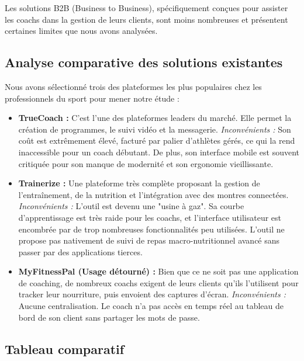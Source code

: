 Les solutions B2B (Business to Business), spécifiquement conçues pour assister les coachs dans la gestion de leurs clients, sont moins nombreuses et présentent certaines limites que nous avons analysées.

\subsection{Analyse comparative des solutions existantes}
Nous avons sélectionné trois des plateformes les plus populaires chez les professionnels du sport pour mener notre étude :

\begin{itemize}
    \item \textbf{TrueCoach :} C'est l'une des plateformes leaders du marché. Elle permet la création de programmes, le suivi vidéo et la messagerie.
    \textit{Inconvénients :} Son coût est extrêmement élevé, facturé par palier d'athlètes gérés, ce qui la rend inaccessible pour un coach débutant. De plus, son interface mobile est souvent critiquée pour son manque de modernité et son ergonomie vieillissante.
    
    \item \textbf{Trainerize :} Une plateforme très complète proposant la gestion de l'entraînement, de la nutrition et l'intégration avec des montres connectées.
    \textit{Inconvénients :} L'outil est devenu une "usine à gaz". Sa courbe d'apprentissage est très raide pour les coachs, et l'interface utilisateur est encombrée par de trop nombreuses fonctionnalités peu utilisées. L'outil ne propose pas nativement de suivi de repas macro-nutritionnel avancé sans passer par des applications tierces.
    
    \item \textbf{MyFitnessPal (Usage détourné) :} Bien que ce ne soit pas une application de coaching, de nombreux coachs exigent de leurs clients qu'ils l'utilisent pour tracker leur nourriture, puis envoient des captures d'écran.
    \textit{Inconvénients :} Aucune centralisation. Le coach n'a pas accès en temps réel au tableau de bord de son client sans partager les mots de passe.
\end{itemize}

\subsection{Tableau comparatif}


